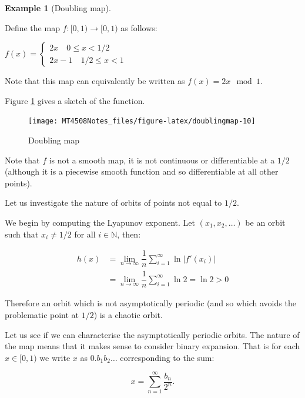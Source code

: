 \documentclass[
  a4paper,
  oneside,
  final]{krantz}
\newcommand{\N}{\mathbb{N}}
\theoremstyle{definition}
\theoremstyle{definition}
\newtheorem{example}{Example}[chapter]
\theoremstyle{definition}
\theoremstyle{definition}
\theoremstyle{remark}
\begin{document}
\begin{example}[Doubling map]
\protect\hypertarget{exm:doublingmap}{}\label{exm:doublingmap}

Define the map \(f: [0,1) \to [0,1)\) as follows:

\(f(x) = \begin{cases} 2x \quad 0 \le x < 1/2 \\ 2x -1 \quad 1/2 \le x < 1 \end{cases}\)

Note that this map can equivalently be written as \(f(x) = 2x \mod{1}\).

Figure \ref{fig:doublingmap} gives a sketch of the function.

\begin{figure}

{\centering \texttt{[image: MT4508Notes\_files/figure-latex/doublingmap-10]} 

}

\caption{Doubling map}\label{fig:doublingmap}
\end{figure}

Note that \(f\) is not a smooth map, it is not continuous or differentiable at a \(1/2\) (although it is a piecewise smooth function and so differentiable at all other points).

Let us investigate the nature of orbits of points not equal to \(1/2\).

We begin by computing the Lyapunov exponent. Let \((x_1, x_2, \ldots)\) be an orbit such that \(x_i \ne 1/2\) for all \(i \in \N\), then:

\begin{align*}
h(x) &= \lim_{n\to \infty} \dfrac{1}{n}\sum_{i=1}^{\infty} \ln |f'(x_i)| \\
    &= \lim_{n\to \infty} \dfrac{1}{n}\sum_{i=1}^{\infty} \ln 2 = \ln 2 > 0
\end{align*}

Therefore an orbit which is not asymptotically periodic (and so which avoids the problematic point at \(1/2\)) is a chaotic orbit.

Let us see if we can characterise the asymptotically periodic orbits. The nature of the map means that it makes sense to consider binary expansion. That is for each \(x \in [0,1)\) we write \(x\) as \(0. b_1 b_2 \ldots\) corresponding to the sum:

\[ x = \sum_{n=1}^{\infty} \dfrac{b_n}{2^{n}}.\]


\end{example}
\end{document}
